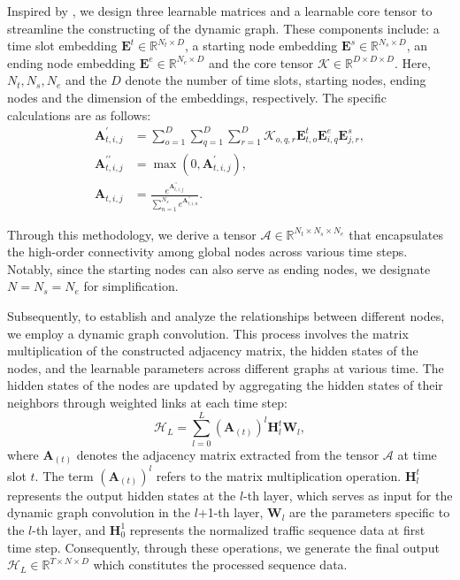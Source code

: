 Inspired by \citet{han2021DMSTGCN}, we design three learnable matrices and a learnable core tensor to streamline the constructing of the dynamic graph. These components include:  a time slot embedding $\mathbf{E}^{t} \in \mathbb{R}^{N_{t}\times D}$, a starting node embedding $\mathbf{E}^{s} \in \mathbb{R}^{N_{s}\times D}$, an ending node embedding $\mathbf{E}^{e} \in \mathbb{R}^{N_{e}\times D}$ and the core tensor $\bm{\mathcal{K}} \in \mathbb{R}^{D\times D\times D}$. Here, $N_{t}, N_{s}, N_{e}$ and the $D$ denote the number of time slots, starting nodes, ending nodes and the dimension of the embeddings, respectively. The specific calculations are as follows:
\begin{equation}
    \begin{aligned}
        \mathbf{A}_{t,i,j}^{\prime}&=\sum_{o=1}^D\sum_{q=1}^D\sum_{r=1}^D\bm{\mathcal{K}}_{o,q,r}\mathbf{E}_{t,o}^t\mathbf{E}_{i,q}^e{\mathbf{E}_{j,r}^s},\\
        \mathbf{A}_{t,i,j}^{\prime\prime}&=\max(0,\mathbf{A}_{t,i,j}^{\prime}),\\
        \mathbf{A}_{t,i,j}&=\frac{e^{\mathbf{A}_{t,i,j}^{\prime\prime}}}{\sum_{n=1}^{N_s}e^{\mathbf{A}_{t,i,n}^{\prime\prime}}}.
    \end{aligned}
\end{equation}

Through this methodology, we derive a tensor $\bm{\mathcal{A}} \in \mathbb{R}^{N_{t}\times N_{s}\times N_{e}}$ that encapsulates the high-order connectivity among global nodes across various time steps. Notably, since the starting nodes can also serve as ending nodes, we designate  $N = N_{s} = N_{e} $ for simplification.

Subsequently, to establish and analyze the relationships between different nodes, we employ a dynamic graph convolution. This process involves the matrix multiplication of the constructed adjacency matrix, the hidden states of the nodes, and the learnable parameters across different graphs at various time. The hidden states of the nodes are updated by aggregating the hidden states of their neighbors through weighted links at each time step:
\begin{equation}
    \bm{\mathcal{H}}_L=\sum\limits_{l=0}^L\left(\mathbf{A}_{(t)}\right)^l\mathbf{H}_{l}^t\mathbf{W}_l,
\end{equation}
where $\mathbf{A}_{(t)}$ denotes the adjacency matrix extracted from the tensor $\bm{\mathcal{A}}$ at time slot $t$. The term $(\mathbf{A}_{(t)})^l$ refers to the matrix multiplication operation. $\mathbf{H}_l^t$ represents the output hidden states at the $l$-th layer, which serves as input for the dynamic graph convolution in the $l$+1-th layer, $\mathbf{W}_l$ are the parameters specific to the $l$-th layer, and $\mathbf{H}_0^1$ represents the normalized traffic sequence data at first time step. Consequently, through these operations, we generate the final output $\bm{\mathcal{H}}_L \in \mathbb{R}^{T\times N\times D}$ which constitutes the processed sequence data.

